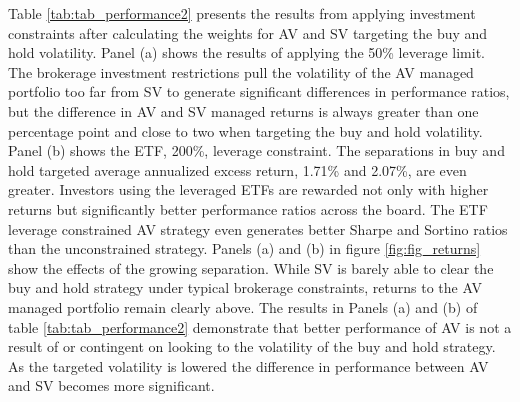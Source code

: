 Table \ref{tab:tab_performance2} presents the results from applying investment constraints after calculating the weights for AV and SV targeting the buy and hold volatility. Panel (a) shows the results of applying the 50\% leverage limit. The brokerage investment restrictions pull the volatility of the AV managed portfolio too far from SV to generate significant differences in performance ratios, but the difference in AV and SV managed returns is always greater than one percentage point and close to two when targeting the buy and hold volatility. Panel (b) shows the ETF, 200\%, leverage constraint. The separations in buy and hold targeted average annualized excess return, 1.71\% and 2.07\%, are even greater. Investors using the leveraged ETFs are rewarded not only with higher returns but significantly better performance ratios across the board. The ETF leverage constrained AV strategy even generates better Sharpe and Sortino ratios than the unconstrained strategy. Panels (a) and (b) in figure \ref{fig:fig_returns} show the effects of the growing separation. While SV is barely able to clear the buy and hold strategy under typical brokerage constraints, returns to the AV managed portfolio remain clearly above. The results in Panels (a) and (b) of table \ref{tab:tab_performance2} demonstrate that better performance of AV is not a result of or contingent on looking to the volatility of the buy and hold strategy. As the targeted volatility is lowered the difference in performance between AV and SV becomes more significant. %

